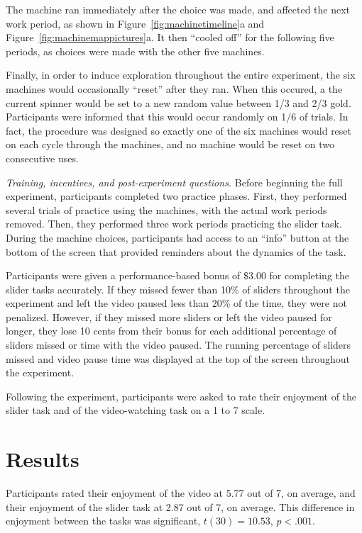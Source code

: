 \documentclass[10pt,letterpaper]{article}
\begin{document}
The machine ran immediately after the choice was
made, and affected the next work period, as shown in
Figure~\ref{fig:machinetimeline}a and Figure~\ref{fig:machinemappictures}a. It then ``cooled off'' for the
following five periods, as choices were made with the other five machines.

Finally, in order to induce exploration throughout the entire experiment, the
six machines would occasionally ``reset'' after they ran. When this occured, a
the current spinner would be set to a new random value between 1/3 and 2/3 gold.
Participants were informed that this would occur randomly on
1/6 of trials. In fact, the procedure was designed so exactly one of the six
machines would reset on each cycle through the machines, and no machine would be
reset on two consecutive uses.



\emph{Training, incentives, and post-experiment questions.}
Before beginning the full experiment, participants completed two
practice phases. First, they performed several trials of practice using the
machines, with the actual work periods removed. Then, they performed three work
periods practicing the slider task.
During the machine choices, participants had access to an ``info'' button at the
bottom of the screen that provided reminders about the dynamics of the task.

Participants were given a performance-based bonus of \$3.00 for completing the
slider tasks accurately. If they missed fewer than 10\% of sliders throughout
the experiment and left the video paused less than 20\% of the time, they were
not penalized. However, if they missed more sliders or left the video paused for
longer, they lose 10 cents from their bonus for each additional percentage of
sliders missed or time with the video paused. The running percentage of sliders
missed and video pause time was displayed at the top of the screen throughout
the experiment.

Following the experiment, participants were asked to rate their enjoyment of the
slider task and of the video-watching task on a 1 to 7 scale.


\section{Results}


Participants rated their enjoyment of the video at 5.77 out of 7, on average,
and their enjoyment of the slider task at 2.87 out of 7, on average. This
difference in enjoyment between the tasks was significant, $t(30)=10.53$, $p<.001$.
\end{document}
